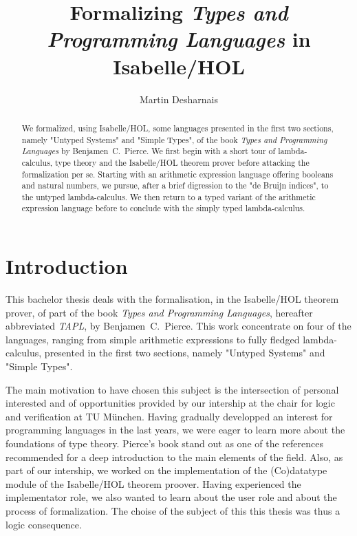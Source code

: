 \documentclass[a4paper, oneside, 12pt, titlepage]{article}
\begin{document}
\title{Formalizing \emph{Types and Programming Languages} in Isabelle/HOL}
\author{Martin Desharnais}
\maketitle

\begin{abstract}
We formalized, using Isabelle/HOL, some languages presented in the first two sections, namely
"Untyped Systems" and "Simple Types", of the book \emph{Types and Programming Languages} by
Benjamen~C.~Pierce. We first begin with a short tour of lambda-calculus, type theory and the
Isabelle/HOL theorem prover before attacking the formalization per se. Starting with an arithmetic
expression language offering booleans and natural numbers, we pursue, after a brief digression to
the "de Bruijn indices", to the untyped lambda-calculus. We then return to a typed variant of the
arithmetic expression language before to conclude with the simply typed lambda-calculus.
\end{abstract}

\tableofcontents
\newpage

\section{Introduction}

This bachelor thesis deals with the formalisation, in the Isabelle/HOL theorem prover, of part of
the book \emph{Types and Programming Languages}, hereafter abbreviated \emph{TAPL}, by
Benjamen~C.~Pierce. This work concentrate on four of the languages, ranging from simple arithmetic
expressions to fully fledged lambda-calculus, presented in the first two sections, namely "Untyped
Systems" and "Simple Types".

The main motivation to have chosen this subject is the intersection of personal interested and of
opportunities provided by our intership at the chair for logic and verification at TU München.
Having gradually developped an interest for programming languages in the last years, we were
eager to learn more about the foundations of type theory. Pierce's book stand out as one of the
references recommended for a deep introduction to the main elements of the field. Also, as part of
our intership, we worked on the implementation of the (Co)datatype module of the Isabelle/HOL
theorem proover. Having experienced the implementator role, we also wanted to learn about the user
role and about the process of formalization. The choise of the subject of this this thesis was thus
a logic consequence.
\end{document}
